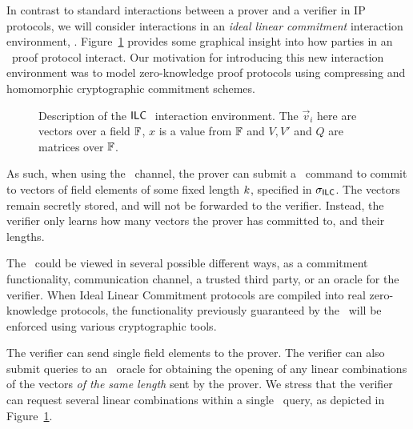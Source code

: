 In contrast to standard interactions between a prover and a verifier in IP protocols, we will consider interactions in an \emph{ideal linear commitment} interaction environment, \ILC. Figure~\ref{ILCSyntaxFigure11} provides some graphical insight into how parties in an \ILC\ proof protocol interact. Our motivation for introducing this new interaction environment was to model zero-knowledge proof protocols using compressing and homomorphic cryptographic commitment schemes.

\begin{figure}[htb]
\caption{Description of the $\mathsf{ILC}~$ interaction environment. The $\vec{v}_i$ here are vectors over a field $\mathbb{F}$, $x$ is a value from $\mathbb{F}$ and $V, V'$ and $Q$ are matrices over $\mathbb{F}$.}\label{ILCSyntaxFigure11}
\end{figure}

As such, when using the \ILC\ channel, the prover can submit a \ILCcommit\ command to commit to
vectors of field elements of some fixed length $k$, specified in $\mathsf{\sigma}_{\mathsf{ILC}}$. The vectors remain secretly stored, and will not be forwarded to the verifier. Instead, the verifier only learns how many vectors the prover has committed to, and their lengths.

The \ILC\ could be viewed in several possible different ways, as a commitment functionality, communication channel, a trusted third party, or an oracle for the verifier. When Ideal Linear Commitment protocols are compiled into real zero-knowledge protocols, the functionality previously guaranteed by the \ILC\ will be enforced using various cryptographic tools.

The verifier can send single field elements to the prover. The verifier can also submit queries to an \ILCopen\ oracle for obtaining the opening of any linear combinations of the vectors \emph{of the same length} sent by the prover. We stress that the verifier can request several linear combinations within a single \ILCopen\ query, as depicted in Figure~\ref{ILCSyntaxFigure11}.

